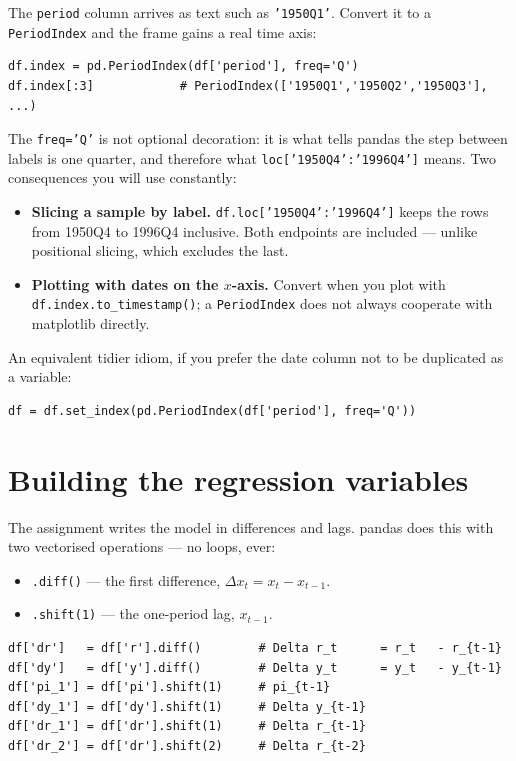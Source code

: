 \documentclass[11pt]{article}
\newcommand{\code}[1]{\texttt{#1}}
\begin{document}
The \code{period} column arrives as text such as \code{'1950Q1'}. Convert it to a
\code{PeriodIndex} and the frame gains a real time axis:

\begin{lstlisting}
df.index = pd.PeriodIndex(df['period'], freq='Q')
df.index[:3]            # PeriodIndex(['1950Q1','1950Q2','1950Q3'], ...)
\end{lstlisting}

\noindent The \code{freq='Q'} is not optional decoration: it is what tells pandas
the step between labels is one quarter, and therefore what
\code{loc['1950Q4':'1996Q4']} means. Two consequences you will use constantly:

\begin{itemize}[leftmargin=1.4em,itemsep=2pt]
  \item \textbf{Slicing a sample by label.} \code{df.loc['1950Q4':'1996Q4']} keeps
        the rows from 1950Q4 to 1996Q4 inclusive. Both endpoints are included ---
        unlike positional slicing, which excludes the last.
  \item \textbf{Plotting with dates on the $x$-axis.} Convert when you plot with
        \code{df.index.to\_timestamp()}; a \code{PeriodIndex} does not always
        cooperate with matplotlib directly.
\end{itemize}

\noindent An equivalent tidier idiom, if you prefer the date column not to be
duplicated as a variable:

\begin{lstlisting}
df = df.set_index(pd.PeriodIndex(df['period'], freq='Q'))
\end{lstlisting}

\section{Building the regression variables}

The assignment writes the model in differences and lags. pandas does this with
two vectorised operations --- no loops, ever:

\begin{itemize}[leftmargin=1.4em,itemsep=2pt]
  \item \code{.diff()} --- the first difference, $\Delta x_t = x_t - x_{t-1}$.
  \item \code{.shift(1)} --- the one-period lag, $x_{t-1}$.
\end{itemize}

\begin{lstlisting}
df['dr']   = df['r'].diff()        # Delta r_t      = r_t   - r_{t-1}
df['dy']   = df['y'].diff()        # Delta y_t      = y_t   - y_{t-1}
df['pi_1'] = df['pi'].shift(1)     # pi_{t-1}
df['dy_1'] = df['dy'].shift(1)     # Delta y_{t-1}
df['dr_1'] = df['dr'].shift(1)     # Delta r_{t-1}
df['dr_2'] = df['dr'].shift(2)     # Delta r_{t-2}
\end{lstlisting}
\end{document}
